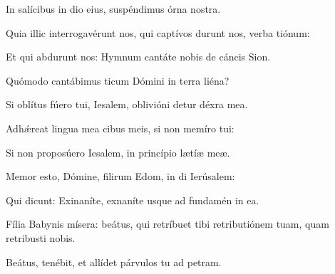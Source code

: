 \item {}

\item In salícibus in dio eius,\psstar{} suspéndimus órna nostra.

\item Quia illic interrogavérunt nos, qui captívos durunt nos,\psstar{} verba tiónum:

\item Et qui abdurunt nos:\psstar{} Hymnum cantáte nobis de cáncis Sion.

\item Quómodo cantábimus ticum Dómini\psstar{} in terra liéna?

\item Si oblítus fúero tui, Iesalem,\psstar{} oblivióni detur déxra mea.

\item Adhǽreat lingua mea cibus meis,\psstar{} si non memíro tui:

\item Si non proposúero Iesalem,\psstar{} in princípio lætíæ meæ.

\item Memor esto, Dómine, filirum Edom,\psstar{} in di Ierúsalem:

\item Qui dicunt: Exinaníte, exnaníte\psstar{} usque ad fundamén in ea.

\item Fília Babynis mísera:\psstar{} beátus, qui retríbuet tibi retributiónem tuam, quam retribusti nobis.

\item Beátus,  tenébit,\psstar{} et allídet párvulos tu ad petram.
